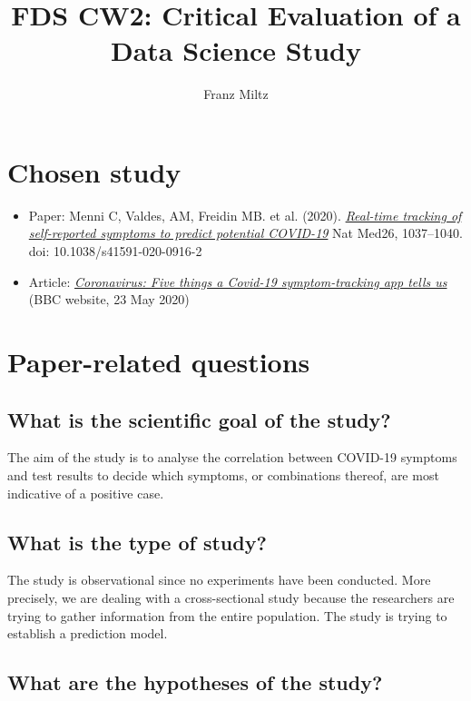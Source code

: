 \documentclass{article}
\title{FDS CW2: Critical Evaluation of a Data Science Study}
\author{Franz Miltz}
\begin{document}
\maketitle

\section*{Chosen study}

\begin{itemize}
	\item Paper: Menni C, Valdes, AM, Freidin MB. et al. (2020).
	      \emph{\href{https://www.nature.com/articles/s41591-020-0916-2?fbclid=IwAR0tkHR2rBZ9vPGhoc8pm7ZreHZ0HdkVOzLGU2mxvYhgZ2n9DkWDZLRfys4}
		      {Real-time tracking of self-reported symptoms to predict potential COVID-19}} Nat Med26, 1037–1040. doi: 10.1038/s41591-020-0916-2
	\item Article: \emph{\href{https://www.bbc.co.uk/news/health-52770313}{Coronavirus: Five things a Covid-19 symptom-tracking app tells us}} (BBC website, 23 May 2020)
\end{itemize}


\section{Paper-related questions}


\subsection{What is the scientific goal of the study?}

The aim of the study is to analyse the correlation between COVID-19 symptoms and test results
to decide which symptoms, or combinations thereof, are most indicative of a positive case.

\subsection{What is the type of study?}

The study is observational since no experiments have been conducted. More precisely, we are
dealing with a cross-sectional study because the researchers are trying to gather information
from the entire population. The study is trying to establish a prediction model.

\subsection{What are the hypotheses of the study?}
\end{document}
